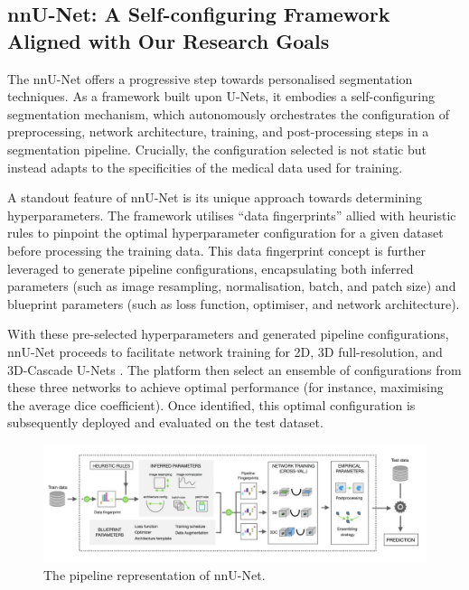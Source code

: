 \subsection{nnU-Net: A Self-configuring Framework Aligned with Our Research Goals}
The nnU-Net \cite{isensee2021nnu} offers a progressive step towards personalised segmentation techniques. As a framework built upon U-Nets, it embodies a self-configuring segmentation mechanism, which autonomously orchestrates the configuration of preprocessing, network architecture, training, and post-processing steps in a segmentation pipeline. Crucially, the configuration selected is not static but instead adapts to the specificities of the medical data used for training. 

A standout feature of nnU-Net is its unique approach towards determining hyperparameters. The framework utilises “data fingerprints” allied with heuristic rules to pinpoint the optimal hyperparameter configuration for a given dataset before processing the training data. This data fingerprint concept is further leveraged to generate pipeline configurations, encapsulating both inferred parameters (such as image resampling, normalisation, batch, and patch size) and blueprint parameters (such as loss function, optimiser, and network architecture).

With these pre-selected hyperparameters and generated pipeline configurations, nnU-Net proceeds to facilitate network training for 2D, 3D full-resolution, and 3D-Cascade U-Nets \cite{isensee2018nnu}. The platform then select an ensemble of configurations from these three networks to achieve optimal performance (for instance, maximising the average dice coefficient). Once identified, this optimal configuration is subsequently deployed and evaluated on the test dataset.

\begin{figure}[htp]
    \centering
    \includegraphics[width=\textwidth]{./figures/nnunet.png}
    \caption{The pipeline representation of nnU-Net.}
    \label{fig:nnu-net}
\end{figure}

